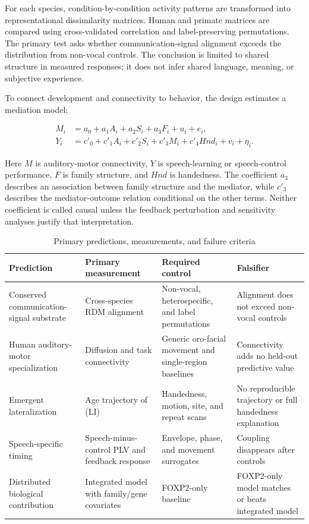 \documentclass[conference]{IEEEtran}
\begin{document}
For each species, condition-by-condition activity patterns are transformed into representational dissimilarity matrices. Human and primate matrices are compared using cross-validated correlation and label-preserving permutations. The primary test asks whether communication-signal alignment exceeds the distribution from non-vocal controls. The conclusion is limited to shared structure in measured responses; it does not infer shared language, meaning, or subjective experience.

To connect development and connectivity to behavior, the design estimates a mediation model:

\begin{align}
M_i&=a_0+a_1A_i+a_2S_i+a_3F_i+u_i+e_i,\nonumber\\
Y_i&=c'_0+c'_1A_i+c'_2S_i+c'_3M_i+c'_4Hnd_i+v_i+\eta_i.
\label{eq:mediation}
\end{align}

Here $M$ is auditory-motor connectivity, $Y$ is speech-learning or speech-control performance, $F$ is family structure, and $Hnd$ is handedness. The coefficient $a_3$ describes an association between family structure and the mediator, while $c'_3$ describes the mediator-outcome relation conditional on the other terms. Neither coefficient is called causal unless the feedback perturbation and sensitivity analyses justify that interpretation.

\begin{table}[t]
\caption{Primary predictions, measurements, and failure criteria}
\label{tab:predictions}
\centering
\scriptsize
\setlength{\tabcolsep}{2pt}
\begin{tabular}{p{}p{}p{}p{}}
\toprule
Prediction & Primary measurement & Required control & Falsifier \\
\midrule
Conserved communication-signal substrate & Cross-species RDM alignment & Non-vocal, heterospecific, and label permutations & Alignment does not exceed non-vocal controls \\
Human auditory-motor specialization & Diffusion and task connectivity & Generic oro-facial movement and single-region baselines & Connectivity adds no held-out predictive value \\
Emergent lateralization & Age trajectory of (LI) & Handedness, motion, site, and repeat scans & No reproducible trajectory or full handedness explanation \\
Speech-specific timing & Speech-minus-control PLV and feedback response & Envelope, phase, and movement surrogates & Coupling disappears after controls \\
Distributed biological contribution & Integrated model with family/gene covariates & FOXP2-only baseline & FOXP2-only model matches or beats integrated model \\
\bottomrule
\end{tabular}
\end{table}
\end{document}
